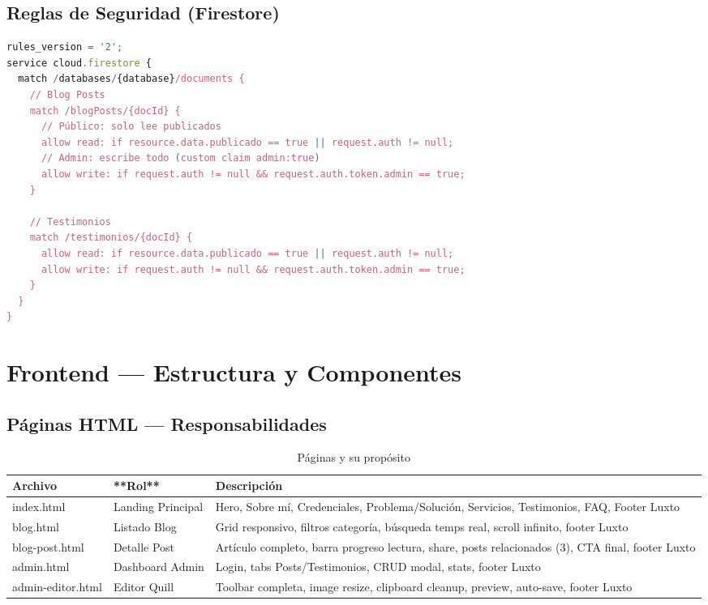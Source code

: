 \documentclass[12pt,a4paper,spanish]{report}
\begin{document}
\section{Reglas de Seguridad (Firestore)}
\begin{lstlisting}[language=JavaScript, caption={firestore.rules (resumen)}]
rules_version = '2';
service cloud.firestore {
  match /databases/{database}/documents {
    // Blog Posts
    match /blogPosts/{docId} {
      // Público: solo lee publicados
      allow read: if resource.data.publicado == true || request.auth != null;
      // Admin: escribe todo (custom claim admin:true)
      allow write: if request.auth != null && request.auth.token.admin == true;
    }

    // Testimonios
    match /testimonios/{docId} {
      allow read: if resource.data.publicado == true || request.auth != null;
      allow write: if request.auth != null && request.auth.token.admin == true;
    }
  }
}
\end{lstlisting}

\chapter{Frontend — Estructura y Componentes}
\label{ch:frontend}

\section{Páginas HTML — Responsabilidades}
\begin{table}[H]
    \centering
    \caption{Páginas y su propósito}
    \label{tab:paginas}
    \begin{tabular}{llp{6cm}}
        \toprule
        \textbf{Archivo} & **Rol** & \textbf{Descripción} \\
        \midrule
        index.html & Landing Principal & Hero, Sobre mí, Credenciales, Problema/Solución, Servicios, Testimonios, FAQ, Footer Luxto \\
        blog.html & Listado Blog & Grid responsivo, filtros categoría, búsqueda temps real, scroll infinito, footer Luxto \\
        blog-post.html & Detalle Post & Artículo completo, barra progreso lectura, share, posts relacionados (3), CTA final, footer Luxto \\
        admin.html & Dashboard Admin & Login, tabs Posts/Testimonios, CRUD modal, stats, footer Luxto \\
        admin-editor.html & Editor Quill & Toolbar completa, image resize, clipboard cleanup, preview, auto-save, footer Luxto \\
        \bottomrule
    \end{tabular}
\end{table}
\end{document}
